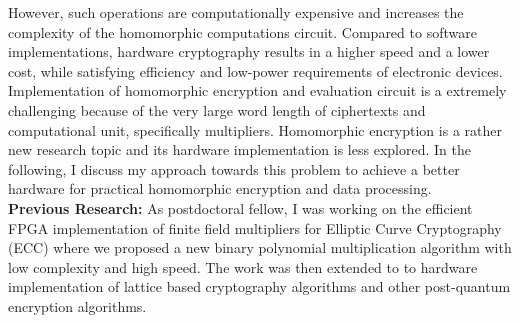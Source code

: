 \documentclass[12pt,oneside]{book}
\begin{document}
 However, such  operations are computationally expensive and increases the complexity of the homomorphic  computations circuit. 
 Compared to software implementations, hardware cryptography results in a higher speed and a lower cost, while satisfying efficiency and low-power requirements of electronic
devices. Implementation of homomorphic encryption and evaluation circuit is a extremely challenging because of the very large word length of ciphertexts and computational unit, specifically multipliers. Homomorphic encryption  is a rather new research topic and its hardware implementation is less explored. In the following, I discuss my approach towards this  problem to achieve a better hardware for practical homomorphic encryption and data processing. 
\\{\bf Previous Research: }
As postdoctoral fellow, I was working on the efficient  FPGA implementation of  finite field multipliers for Elliptic Curve Cryptography (ECC)  where we proposed a new binary polynomial multiplication algorithm with low complexity and high speed.
The work was then extended to to hardware implementation of lattice based cryptography  algorithms and other post-quantum encryption algorithms.
\\
\end{document}
